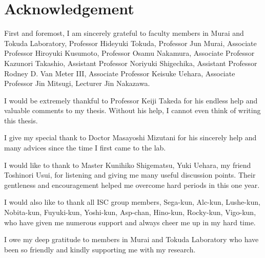 \section*{Acknowledgement}

First and foremost, I am sincerely grateful to faculty members in Murai and Tokuda Laboratory, Professor Hideyuki Tokuda, Professor Jun Murai, Associate Professor Hiroyuki Kusumoto, Professor Osamu Nakamura, Associate Professor Kazunori Takashio, Assistant Professor Noriyuki Shigechika, Assistant Professor Rodney D. Van Meter III, Associate Professor Keisuke Uehara, Associate Professor Jin Mitsugi, Lecturer Jin Nakazawa.

I would be extremely thankful to Professor Keiji Takeda for his endless help and valuable comments to my thesis. Without his help, I cannot even think of writing this thesis.

I give my special thank to Doctor Masayoshi Mizutani for his sincerely help and many advices since the time I first came to the lab.

I would like to thank to Master Kunihiko Shigematsu, Yuki Uehara, my friend Toshinori Usui, for listening	and giving me many useful discussion points. Their gentleness and encouragement helped me overcome hard periods in this one year. 
 
I would also like to thank all ISC group members, Sega-kun, Alc-kun, Lushe-kun, Nobita-kun, Fuyuki-kun, Yoshi-kun, Asp-chan, Hino-kun, Rocky-kun, Vigo-kun, who have given me numerous support and always cheer me up in my hard time. 

I owe my deep gratitude to members in Murai and Tokuda Laboratory who have been so friendly and kindly supporting me with my research.


